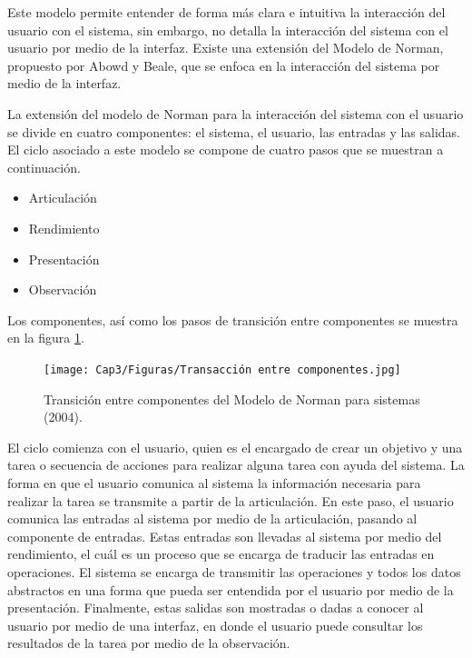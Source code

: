 Este modelo permite entender de forma más clara e intuitiva la interacción del usuario con el sistema, sin embargo, no detalla la interacción del sistema con el usuario por medio de la interfaz. Existe una extensión del Modelo de Norman, propuesto por Abowd y Beale, que se enfoca en la interacción del sistema por medio de la interfaz. 

La extensión del modelo de Norman para la interacción del sistema con el usuario se divide en cuatro componentes: el sistema, el usuario, las entradas y las salidas. El ciclo asociado a este modelo se compone de cuatro pasos que se muestran a continuación.

\begin{itemize}
  \item Articulación
  \item Rendimiento
  \item Presentación
  \item Observación
\end{itemize}

Los componentes, así como los pasos de transición entre componentes se muestra en la figura \ref{fig:31}.

\begin{figure}
  \centering
  \texttt{[image: Cap3/Figuras/Transacción entre componentes.jpg]}
  \caption{Transición entre componentes del Modelo de Norman para sistemas (2004).}
  \label{fig:31}
\end{figure}

El ciclo comienza con el usuario, quien es el encargado de crear un objetivo y una tarea o secuencia de acciones para realizar alguna tarea con ayuda del sistema. La forma en que el usuario comunica al sistema la información necesaria para realizar la tarea se transmite a partir de la articulación. En este paso, el usuario comunica las entradas al sistema por medio de la articulación, pasando al componente de entradas. Estas entradas son llevadas al sistema por medio del rendimiento, el cuál es un proceso que se encarga de traducir las entradas en operaciones. El sistema se encarga de transmitir las operaciones y todos los datos abstractos en una forma que pueda ser entendida por el usuario por medio de la presentación. Finalmente, estas salidas son mostradas o dadas a conocer al usuario por medio de una interfaz, en donde el usuario puede consultar los resultados de la tarea por medio de la observación.

